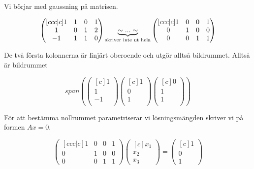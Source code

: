 \documentclass[../../main.tex]{subfiles}
\begin{document}
\begin{solution}{17} %

    Vi börjar med gaussning på matrisen.

    $$
        \begin{pmatrix}[ccc|c]
            1  & 1 & 0 & 1 \\
            1  & 0 & 1 & 2 \\
            -1 & 1 & 1 & 0
        \end{pmatrix}
        \underbrace{\sim ... \sim}_{\text{skriver inte ut hela}}
        \begin{pmatrix}[ccc|c]
            1 & 0 & 0 & 1 \\
            0 & 1 & 0 & 0 \\
            0 & 0 & 1 & 1
        \end{pmatrix}
    $$


    De två första kolonnerna är linjärt oberoende och utgör alltså bildrummet. Alltså är bildrummet

    $$
        span({\begin{pmatrix}[c]
                    1  \\
                    1  \\
                    -1 \\
                \end{pmatrix}
                \begin{pmatrix}[c]
                    1 \\
                    0 \\
                    1 \\
                \end{pmatrix}
                \begin{pmatrix}[c]
                    0 \\
                    1 \\
                    1 \\
                \end{pmatrix}
            })
    $$

    För att bestämma nollrummet parametriserar vi lösningsmängden skriver vi på formen $Ax = 0$.

    $$
        \begin{pmatrix}[ccc|c]
            1 & 0 & 0 & 1 \\
            0 & 1 & 0 & 0 \\
            0 & 0 & 1 & 1
        \end{pmatrix}
        \begin{pmatrix}[c]
            x_1 \\
            x_2 \\
            x_3
        \end{pmatrix}
        =
        \begin{pmatrix}[c]
            1 \\
            0 \\
            1
        \end{pmatrix}
    $$


\end{solution}
\end{document}
